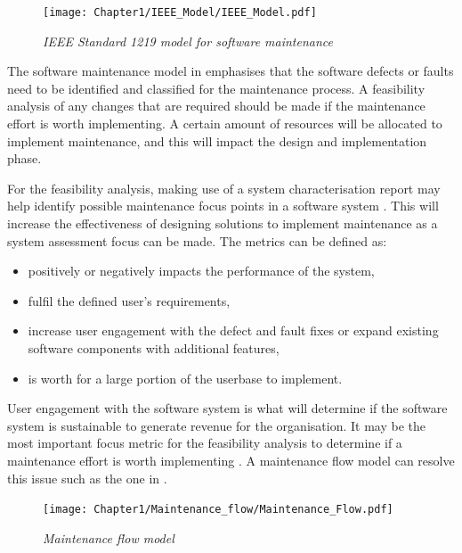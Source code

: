 \begin{figure}[!htb] %
	\centering %
	\texttt{[image: Chapter1/IEEE\_Model/IEEE\_Model.pdf]}
	\caption[IEEE Standard 1219 model for software maintenance]
	{\textit{IEEE Standard 1219 model for software maintenance \cite{Ren2011}}} \label{fig:ch1_ieeeModel}
\end{figure}

The software maintenance model in  emphasises that the software defects or faults need to be identified and classified for the maintenance process. A feasibility analysis of any changes that are required should be made if the maintenance effort is worth implementing. A certain amount of resources will be allocated to implement maintenance, and this will impact the design and implementation phase.\par For the feasibility analysis, making use of a system characterisation report may help identify possible maintenance focus points in a software system \cite{Araujo2021}. This will increase the effectiveness of designing solutions to implement maintenance as a system assessment focus can be made. The metrics can be defined as:

\begin{itemize}
	\item positively or negatively impacts the performance of the system,
	\item fulfil the defined user's requirements,
	\item increase user engagement with the defect and fault fixes or expand existing software components with additional features,
	\item is worth for a large portion of the userbase to implement.
\end{itemize}

User engagement with the software system is what will determine if the software system is sustainable to generate revenue for the organisation. It may be the most important focus metric for the feasibility analysis to determine if a maintenance effort is worth implementing \cite{Araujo2021}. A maintenance flow model can resolve this issue such as the one in .  

\begin{figure}[!htb] %
	\centering %
	\texttt{[image: Chapter1/Maintenance\_flow/Maintenance\_Flow.pdf]}
	\caption[Maintenance flow model]
	{\textit{Maintenance flow model \cite{Tang2010}}} \label{fig:ch1_maintenanceFlow}
\end{figure}


